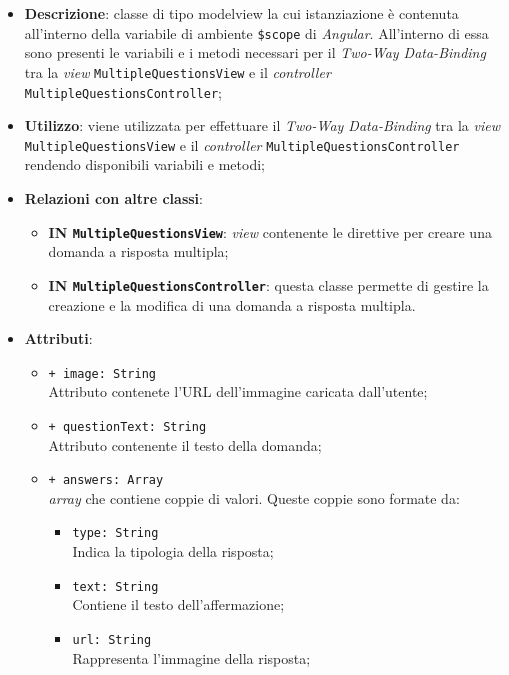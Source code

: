 \begin{itemize}
	\item \textbf{Descrizione}: classe di tipo modelview la cui istanziazione è contenuta all'interno della variabile di ambiente \texttt{\$scope} di \textit{Angular}. All'interno di essa sono presenti le variabili e i metodi necessari per il \textit{Two-Way Data-Binding} tra la \textit{view} \texttt{MultipleQuestionsView} e il \textit{controller} \texttt{MultipleQuestionsController}; 
	\item \textbf{Utilizzo}: viene utilizzata per effettuare il \textit{Two-Way Data-Binding} tra la \textit{view} \\\texttt{MultipleQuestionsView} e il \textit{controller} \texttt{MultipleQuestionsController} rendendo disponibili variabili e metodi;
	\item \textbf{Relazioni con altre classi}:
	\begin{itemize}
		\item \textbf{IN \texttt{MultipleQuestionsView}}: \textit{view} contenente le direttive per creare una domanda a risposta multipla; 
		\item \textbf{IN \texttt{MultipleQuestionsController}}: questa classe permette di gestire la creazione e la modifica di una domanda a risposta multipla.
	\end{itemize}
	\item \textbf{Attributi}:
	\begin{itemize}
		\item \texttt{+ image: String} \\ Attributo contenete l'URL dell'immagine caricata dall'utente;
		\item \texttt{+ questionText: String} \\ Attributo contenente il testo della domanda;
		\item \texttt{+ answers: Array}\\ \textit{array} che contiene coppie di valori. Queste coppie sono formate da:
		\begin{itemize}
			\item \texttt{type: String} \\ Indica la tipologia della risposta;
			\item \texttt{text: String} \\ Contiene il testo dell'affermazione;
			\item \texttt{url: String} \\ Rappresenta l'immagine della risposta;

\end{itemize}
\end{itemize}
\end{itemize}
